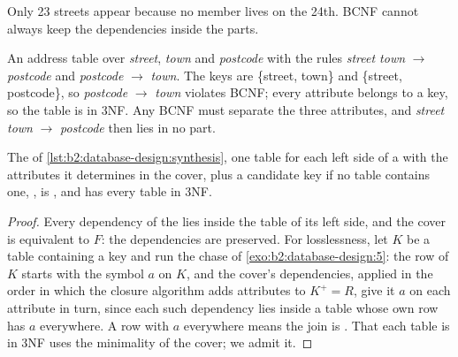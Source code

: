 \label{out:b2:database-design:decomposed}

Only 23 streets appear because no member lives on the 24th. BCNF cannot always keep the
dependencies inside the parts.

\begin{example}\label{ex:b2:database-design:no-preserving-bcnf}
An address table over \emph{street}, \emph{town} and \emph{postcode} with the rules \emph{street town} $\to$
\emph{postcode} and \emph{postcode} $\to$ \emph{town}. The keys are \{street, town\} and \{street, postcode\}, so
\emph{postcode} $\to$ \emph{town} violates BCNF; every attribute belongs to a key, so the table is in 3NF. Any BCNF
 must separate the three attributes, and \emph{street town} $\to$ \emph{postcode} then lies in no part.
\end{example}

\label{out:b2:database-design:no-preserving}

\label{lst:b2:database-design:synthesis}

\begin{theorem}[3NF synthesis]\label{thm:b2:database-design:3nf-synthesis}
The  of \cref{lst:b2:database-design:synthesis}, one table for each left side of a  with the
attributes it determines in the cover, plus a candidate key if no table contains one, , is
, and has every table in 3NF.
\end{theorem}

\begin{proof}
Every dependency of the  lies inside the table of its left side, and the cover is equivalent to $F$: the
dependencies are preserved. For losslessness, let $K$ be a table containing a key and run the chase of
\cref{exo:b2:database-design:5}: the row of $K$ starts with the symbol $a$ on $K$, and the cover's dependencies, applied in
the order in which the closure algorithm adds attributes to $K^+ = R$, give it $a$ on each attribute in turn, since each
such dependency lies inside a table whose own row has $a$ everywhere. A row with $a$ everywhere means the join is
. That each table is in 3NF uses the minimality of the cover; we admit it.
\end{proof}

